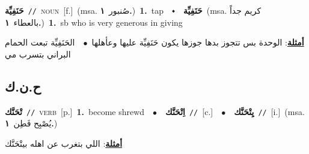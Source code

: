 \documentclass[10pt,a4paper,twoside]{article} %
\begin{document}
\begin{multicols}{2}
{\setlength\topsep{0pt}\textbf{\foreignlanguage{arabic}{حَنَفِيِّة}}\ {\color{gray}\texttt{//}\color{black}}\ \textsc{noun}\ [f.]\ \color{gray}(msa. \foreignlanguage{arabic}{صُنبور}~\foreignlanguage{arabic}{\textbf{١.}})\color{black}\ \textbf{1.}~tap\ \ $\smblkdiamond$\ \ \setlength\topsep{0pt}\textbf{\foreignlanguage{arabic}{حَنَفِيِّة}}\ \color{gray}(msa. \foreignlanguage{arabic}{كريم جداً بالعطاء}~\foreignlanguage{arabic}{\textbf{١.}})\color{black}\ \textbf{1.}~sb who is very generous in giving\  \begin{flushright}\color{gray}\foreignlanguage{arabic}{\textbf{\underline{\foreignlanguage{arabic}{أمثلة}}}: الوحدة بس تتجوز بدها جوزها يكون حَنَفِيِّة عليها وعأهلها\ $\bullet$\ \  الحَنَفِيِّة تبعت الحمام البراني بتسرب مي}\end{flushright}\color{black}} \vspace{2mm}

\vspace{-3mm}
\subsection*{\color{blue}\foreignlanguage{arabic}{ح.ن.ك}\color{blue}{}} 

{\setlength\topsep{0pt}\textbf{\foreignlanguage{arabic}{تْحَنَّك}}\ {\color{gray}\texttt{//}\color{black}}\ \textsc{verb}\ [p.]\ \textbf{1.}~become shrewd\ \ $\bullet$\ \ \setlength\topsep{0pt}\textbf{\foreignlanguage{arabic}{اِتْحَنَّك}}\ {\color{gray}\texttt{//}\color{black}}\ [c.]\ \ $\bullet$\ \ \setlength\topsep{0pt}\textbf{\foreignlanguage{arabic}{يِتْحَنَّك}}\ {\color{gray}\texttt{//}\color{black}}\ [i.]\ \color{gray}(msa. \foreignlanguage{arabic}{يُصْبِح فَطِن}~\foreignlanguage{arabic}{\textbf{١.}})\color{black}\  \begin{flushright}\color{gray}\foreignlanguage{arabic}{\textbf{\underline{\foreignlanguage{arabic}{أمثلة}}}: اللي بتغرب عن اهله بيتْحَنَّك}\end{flushright}\color{black}} \vspace{2mm}


\end{multicols}
\end{document}
